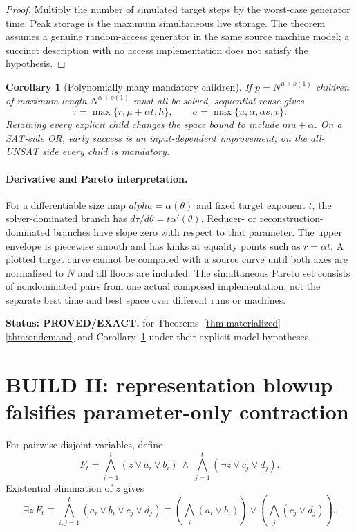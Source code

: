 \documentclass[11pt]{article}
\newtheorem{corollary}[theorem]{Corollary}
\newcommand{\Status}[1]{\textbf{Status: #1.}}
\begin{document}
\begin{proof}
Multiply the number of simulated target steps by the worst-case generator time.  Peak storage is the
maximum simultaneous live storage.  The theorem assumes a genuine random-access generator in the
same source machine model; a succinct description with no access implementation does not satisfy the
hypothesis.
\end{proof}

\begin{corollary}[Polynomially many mandatory children]
\label{cor:many}
If $p=N^{\mu+o(1)}$ children of maximum length $N^{\alpha+o(1)}$ must all be solved, sequential reuse
gives
\[
 \tau=\max\{r,\mu+\alpha t,h\},\qquad
 \sigma=\max\{u,\alpha,\alpha s,v\}.
\]
Retaining every explicit child changes the space bound to include $mu+\alpha$.  On a SAT-side OR,
early success is an input-dependent improvement; on the all-UNSAT side every child is mandatory.
\end{corollary}

\paragraph{Derivative and Pareto interpretation.}
For a differentiable size map $alpha=\alpha(\theta)$ and fixed target exponent $t$, the
solver-dominated branch has $d\tau/d\theta=t\alpha'(\theta)$.  Reducer- or reconstruction-dominated
branches have slope zero with respect to that parameter.  The upper envelope is piecewise smooth and
has kinks at equality points such as $r=\alpha t$.  A plotted target curve cannot be compared with a
source curve until both axes are normalized to $N$ and all floors are included.  The simultaneous
Pareto set consists of nondominated pairs from one actual composed implementation, not the separate
best time and best space over different runs or machines.

\Status{PROVED/EXACT} for Theorems~\ref{thm:materialized}--\ref{thm:ondemand} and
Corollary~\ref{cor:many} under their explicit model hypotheses.

\section{BUILD II: representation blowup falsifies parameter-only contraction}

For pairwise disjoint variables, define
\[
 F_t=\bigwedge_{i=1}^t(z\vee a_i\vee b_i)\ \wedge\
     \bigwedge_{j=1}^t(\neg z\vee c_j\vee d_j).
\]
Existential elimination of $z$ gives
\[
 \exists z\,F_t\equiv
 \bigwedge_{i,j=1}^t(a_i\vee b_i\vee c_j\vee d_j)
 \equiv
 \left(\bigwedge_i(a_i\vee b_i)\right)\vee
 \left(\bigwedge_j(c_j\vee d_j)\right).
\]
\end{document}
